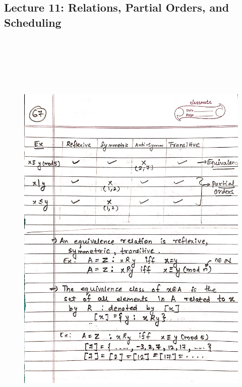 \newpage
{\color{black} \subsection*{Lecture 11: Relations, Partial Orders, and Scheduling}}
\begin{figure}[H]
    \centering
    \includegraphics[width=16cm, height=21cm]{"./MIT-6.042J/MIT-6042J-067"}
\end{figure}

